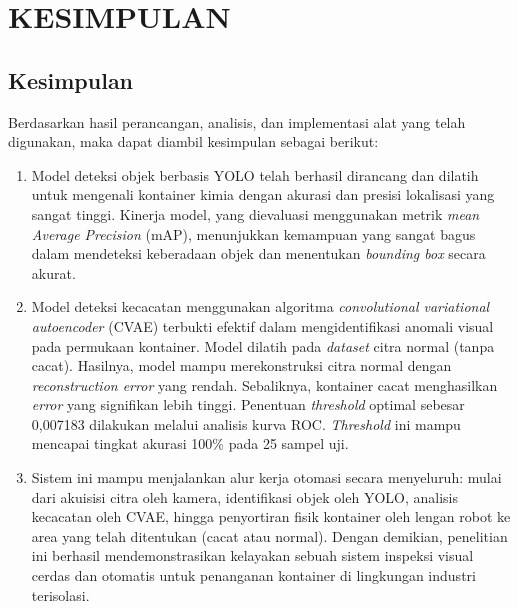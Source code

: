 \chapter{KESIMPULAN}
\section{Kesimpulan}
Berdasarkan hasil perancangan, analisis, dan implementasi alat yang
telah digunakan, maka dapat diambil kesimpulan sebagai berikut:
\begin{enumerate}
  \item Model deteksi objek berbasis YOLO telah berhasil dirancang dan
    dilatih untuk mengenali kontainer kimia dengan akurasi dan
    presisi lokalisasi yang sangat tinggi. Kinerja model, yang
    dievaluasi menggunakan metrik \textit{mean Average Precision} (mAP),
    menunjukkan kemampuan yang sangat bagus dalam mendeteksi
    keberadaan objek dan menentukan \textit{bounding box} secara akurat.
  \item Model deteksi kecacatan menggunakan algoritma \textit{convolutional
    variational autoencoder} (CVAE) terbukti efektif dalam
    mengidentifikasi anomali visual pada permukaan kontainer. Model
    dilatih pada \textit{dataset} citra normal (tanpa cacat). Hasilnya, model
    mampu merekonstruksi citra normal dengan \textit{reconstruction
    error} yang rendah. Sebaliknya, kontainer cacat menghasilkan \textit{error}
    yang signifikan lebih tinggi. Penentuan \textit{threshold} optimal sebesar
    0,007183 dilakukan melalui analisis kurva ROC. \textit{Threshold} ini
    mampu mencapai tingkat akurasi 100\% pada 25 sampel uji.
  \item Sistem ini mampu menjalankan alur kerja otomasi secara
    menyeluruh: mulai dari akuisisi citra oleh kamera, identifikasi
    objek oleh YOLO, analisis kecacatan oleh CVAE, hingga penyortiran
    fisik kontainer oleh lengan robot ke area yang telah ditentukan
    (cacat atau normal). Dengan demikian, penelitian ini berhasil
    mendemonstrasikan kelayakan sebuah sistem inspeksi visual cerdas
    dan otomatis untuk penanganan kontainer di lingkungan industri terisolasi.
\end{enumerate}

\vspace{1em}


